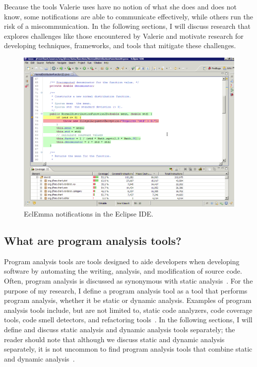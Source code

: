 \documentclass{llncs}
\begin{document}
Because the tools Valerie uses have no notion of what she does and does not know, some notifications are able to communicate effectively, while others run the risk of a miscommunication. In the following sections, I will discuss research that explores challenges like those encountered by Valerie and motivate research for developing techniques, frameworks, and tools that mitigate these challenges.

\begin{figure} [ht]
	\centering
	\includegraphics[width=\textwidth]{figs/eclemma.png}
	\caption{EclEmma notifications in the Eclipse IDE.}
	\label{fig:ecl}
\end{figure}

\subsection{What are program analysis tools?}
Program analysis tools are tools designed to aide developers when developing software by automating the writing, analysis, and modification of source code.
Often, program analysis is discussed as synonymous with static analysis~\cite{nielson2015principles}. 
For the purpose of my research, I define a program analysis tool as a tool that performs program analysis, whether it be static or dynamic analysis.
Examples of program analysis tools include, but are not limited to, static code analyzers, code coverage tools, code smell detectors, and refactoring tools~\cite{adolph2011using,Murphy-Hill:2010:Ambient,ge2012reconciling}.
In the following sections, I will define and discuss static analysis and dynamic analysis tools separately; the reader should note that although we discuss static and dynamic analysis separately, it is not uncommon to find program analysis tools that combine static and dynamic analysis~\cite{ernst2003static}.                                                
\end{document}
